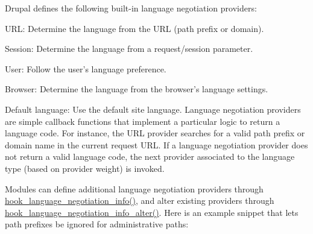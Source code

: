 Drupal defines the following built-\/in language negotiation providers:
\begin{DoxyItemize}
\item URL: Determine the language from the URL (path prefix or domain).
\item Session: Determine the language from a request/session parameter.
\item User: Follow the user's language preference.
\item Browser: Determine the language from the browser's language settings.
\item Default language: Use the default site language. Language negotiation providers are simple callback functions that implement a particular logic to return a language code. For instance, the URL provider searches for a valid path prefix or domain name in the current request URL. If a language negotiation provider does not return a valid language code, the next provider associated to the language type (based on provider weight) is invoked.
\end{DoxyItemize}

Modules can define additional language negotiation providers through \hyperlink{group__language__negotiation_gabcac4b239272ba30c6320a0af2fab46e}{hook\_\-language\_\-negotiation\_\-info()}, and alter existing providers through \hyperlink{group__language__negotiation_gacaed046505a0a8470514731b86910089}{hook\_\-language\_\-negotiation\_\-info\_\-alter()}. Here is an example snippet that lets path prefixes be ignored for administrative paths: 


